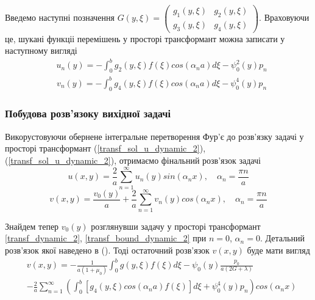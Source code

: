 Введемо наступні позначення $G(y, \xi) = \begin{pmatrix}
    g_1(y,\xi) & g_2(y,\xi) \\
    g_3(y,\xi) & g_4(y,\xi)
\end{pmatrix}$. Враховуючи це, шукані функціі перемішень у просторі трансформант можна записати у наступному вигляді
\begin{align}\label{transf_sol_u_dynamic_2}
    &u_n(y) = -\int_0^b g_2(y, \xi)f(\xi) cos(\alpha_n a) d\xi - \psi_0^2(y) p_n
\end{align}
\begin{align}\label{transf_sol_v_dynamic_2}
    &v_n(y) = -\int_0^b g_4(y, \xi)f(\xi) cos(\alpha_n a) d\xi - \psi_0^4(y) p_n
\end{align}

\subsubsection{Побудова розв'язоку вихідної задачі}
Викорустовуючи обернене інтегральне перетворення Фур'є до розв'язку задачі у просторі трансформант
(\ref{transf_sol_u_dynamic_2}), (\ref{transf_sol_u_dynamic_2}), отримаємо фінальний розв'язок задачі
\begin{equation}
    u(x,y) = \frac{2}{a} \sum_{n=1}^{\infty} u_n(y) sin(\alpha_n x), \quad \alpha_n = \frac{\pi n}{a}
\end{equation}
\begin{equation}
    v(x,y) = \frac{v_0(y)}{a} + \frac{2}{a} \sum_{n=1}^{\infty} v_n(y) cos(\alpha_n x), \quad \alpha_n = \frac{\pi n}{a}
\end{equation}

Знайдем тепер $v_0(y)$ розглянувши задачу у просторі трансформант \eqref{transf_dynamic_2}, \eqref{transf_bound_dynamic_2} при $n=0$, $\alpha_n = 0$.
Детальний розв'язок якої наведено в (). Тоді остаточний розв'язок $v(x,y)$ буде мати вигляд
\begin{align}
    &v(x,y) = -\frac{1}{a(1+\mu_0)} \int_{0}^{b}g(y,\xi) f(\xi) d\xi - \psi_0(y) \frac{p_0}{a(2G + \lambda)} \nonumber \\
    &- \frac{2}{a} \sum_{n=1}^{\infty} \left( \int_0^b \left[g_4(y, \xi) cos(\alpha_n a) f(\xi) \right]d\xi + \psi_0^4(y) p_n  \right) cos(\alpha_n x)
\end{align}

